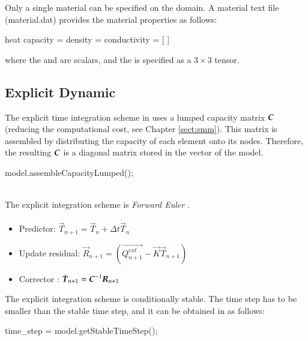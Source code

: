 Only a single material can be specified on the domain.
A material text file (\eg material.dat) provides the material properties as follows:
\begin{cpp}
  heat %
  capacity = %
  density = %
  conductivity = [%
  ]
\end{cpp}
where the  and  are scalars, and the  is specified as a $3\times 3$ tensor.

\subsection{Explicit Dynamic}

The explicit  time integration scheme in \akantu  uses a lumped capacity
matrix $\boldsymbol{C}$ (reducing the computational  cost, see Chapter \ref{sect:smm}).
This matrix is assembled by
distributing the capacity of each element onto its nodes. Therefore, the resulting $\boldsymbol{C}$ is a diagonal matrix stored in the  vector of the model.

\begin{cpp}
  model.assembleCapacityLumped();
\end{cpp}

 \\

The explicit integration scheme is  \emph{Forward Euler}
\cite{curnier92a}.

\begin{itemize}
\item Predictor: $\vec{T}_{n+1} = \vec{T}_{n} + \Delta t \dot{\vec{T}}_{n}$
\item Update residual: $\vec{R}_{n+1} = \left( \vec{Q^{ext}_{n+1}} - \vec{K}\vec{T}_{n+1} \right)$
\item Corrector : $\dot{\boldsymbol{T}}_{n+1} = \boldsymbol{C}^{-1} \boldsymbol{R}_{n+1}$
\end{itemize}

The explicit integration scheme is conditionally stable. The time step has to be smaller than the stable time step,
and it can be obtained in \akantu as follows:

\begin{cpp}
  time_step = model.getStableTimeStep();
\end{cpp}

